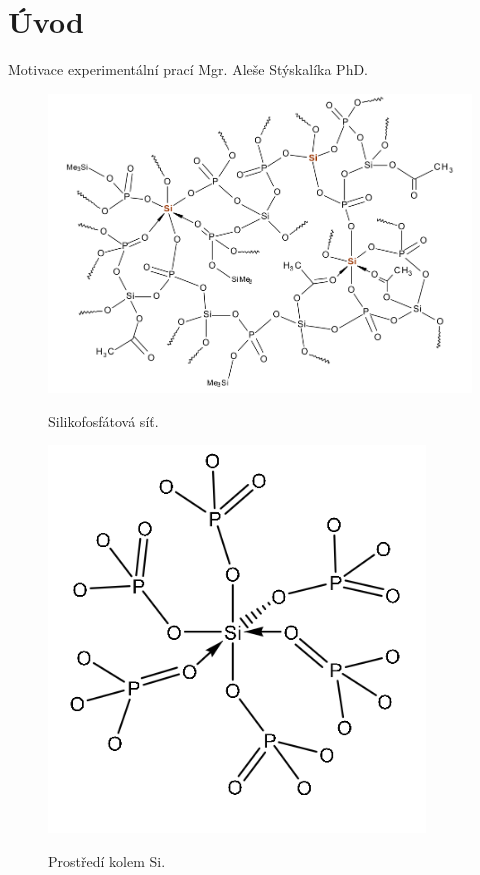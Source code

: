 \documentclass[
  digital, %
  table,   %
  lof,     %
  lot,     %
]{fithesis3}
\begin{document}
\chapter{Úvod}

\begin{otherlanguage}{czech}
Motivace experimentální prací Mgr. Aleše Stýskalíka PhD. 



 \begin{figure}[h!]
\caption{Silikofosfátová síť. \cite{Styskalik2015thesis} }
  \center
  \includegraphics[width=15cm]{si_polymer_cely.png}
  \label{si_polymer_cely}
  \end{figure}

\begin{figure}[h!]
\caption{Prostředí kolem Si. \cite{Styskalik2015thesis} }
  \center
  \includegraphics[width=10cm]{si_koordinovane_6_P.png}
  \label{si_koordinovane_6_P}
  \end{figure}
  

\end{otherlanguage}
\end{document}
